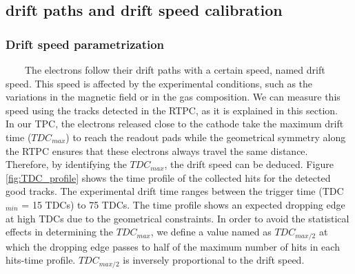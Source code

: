 \subsection{drift paths and drift speed calibration}

\subsubsection{Drift speed parametrization}
~~~~The electrons follow their drift paths with a certain speed, named drift speed. This speed is affected by the experimental conditions, such as the variations in the magnetic field or in the gas composition. We can measure this speed using the tracks detected in the RTPC, as it is explained in this section.\\


In our TPC, the electrons released close to the cathode take the maximum drift time ($TDC_{max}$) to reach the readout pads while the geometrical symmetry along the RTPC ensures that these electrons always travel the same distance. Therefore, by identifying the $TDC_{max}$, the drift speed can be deduced. Figure \ref{fig:TDC_profile} shows the time profile of the collected hits for the detected good tracks. The experimental drift time ranges between the trigger time (TDC$_{min}$ = 15 TDCs) to 75 TDCs. The time profile shows an expected dropping edge at high TDCs due to the geometrical constraints. In order to avoid the statistical effects in determining the  $TDC_{max}$, we define a value named as $TDC_{max/2}$ at which the dropping edge passes to half of the maximum number of hits in each hits-time profile. $TDC_{max/2}$ is inversely proportional to the drift speed.\\
 

